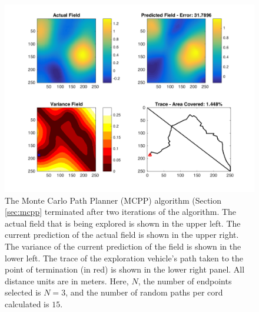 

\begin{figure}[htb!]
	\centering
	\includegraphics[width=0.95\linewidth]{figures/mc_4panel.png}
	\captionsetup{skip=0.20\baselineskip}
	\ssp
	\caption{The Monte Carlo Path Planner (MCPP) algorithm (Section \ref{sec:mcpp} terminated after two iterations of the algorithm. The actual field that is being explored is shown in the upper left. The current prediction of the actual field is shown in the upper right. The variance of the current prediction of the field is shown in the lower left. The trace of the exploration vehicle's path taken to the point of termination (in red) is shown in the lower right panel. All distance units are in meters. Here, $N$, the number of endpoints selected is $N=3$, and the number of random paths per cord calculated is $15$.}
	\label{fig:mcpp}
\end{figure}
\clearpage

